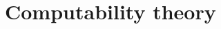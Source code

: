 \chapter{Computability theory}\label{ch:computability_theory}

\begin{definition}\label{def:turing_machine}
\end{definition}
